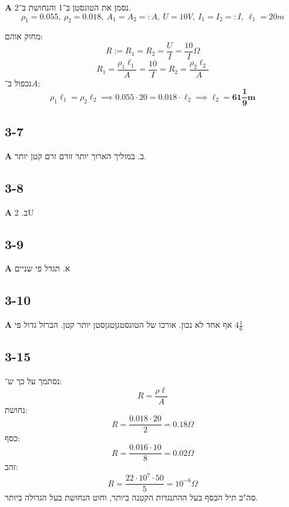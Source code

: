 \documentclass[]{article}
\newcommand\ml    {\ell}
\begin{document}
	\textbf{A}
	נסמן את הטוגסטן ב־1 והנחושת ב־2. 
	\[ \rho_1 = 0.055, \ \rho_2 = 0.018, \ A_1 = A_2 =: A, \ U = 10V, \ I_1 = I_2 =: I, \ \ell_1 = 20m \]
	
	מחוק אוהם: 
	\[ R := R_1 = R_2 = \frac{U}{I} = \frac{10}{I}\Omega \]
	\[ R_1 = \frac{\rho_1\ell_1}{A} = \frac{10}{I} = R_2 = \frac{\rho_2\ell_2}{A} \]
	נכפול ב־$A$: 
	\[ \rho_1\ell_1 = \rho_2\ell_2 \implies 0.055 \cdot 20 = 0.018 \cdot \ell_2 \implies \ell_2 = \bm{61\frac{1}{9}m} \]
	
	\subsection*{3-7}
	\textbf{A} ב. במוליך הארוך יותר זורם זרם קטן יותר. 
	\subsection*{3-8}
	\textbf{A} ב. 2U
	\subsection*{3-9}
	\textbf{A} א. תגדל פי שניים
	\subsection*{3-10}
	\textbf{A} אף אחד לא נכון. אורכו של הטוגסטגןטגןסטן יותר קטן. הברזל גדול פי $4\frac{1}{6}$
	\subsection*{3-15}
	נסתמך על כך ש־: 
	\[ R = \frac{\rho\ml}{A} \]
	נחושת: 
	\[ R = \frac{0.018 \cdot 20}{2} = 0.18\Omega \]
	כסף:
	\[ R = \frac{0.016 \cdot 10}{8} = 0.02\Omega \]
	זהב: 
	\[ R = \frac{22 \cdot 10^{7} \cdot 50}{5} = 10^{-6}\Omega \]
	סה"כ תיל הכסף בעל ההתנגדות הקטנה ביותר, וחוט הנחושת בעל הגדולה ביותר. 
	
	
	
	
\end{document}
